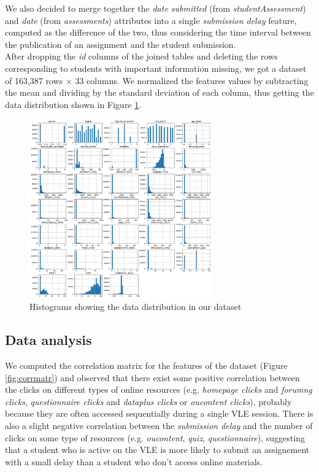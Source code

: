 \documentclass{article}
\begin{document}
We also decided to merge together the \textit{date submitted} (from \textit{studentAssessment}) and \textit{date} (from \textit{assessments}) attributes into a single \textit{submission delay} feature, computed as the difference of the two, thus considering the time interval between the publication of an assignment and the  student submission.\\

After dropping the \textit{id} columns of the joined tables and deleting the rows corresponding to students with important information missing, we got a dataset of 163,387 rows × 33 columns. We normalized the features values by subtracting the mean and dividing by the standard deviation of each column, thus getting the data distribution shown in Figure \ref{fig:distr}.\\


\begin{figure}
\centering
\includegraphics[width=0.7\textwidth]{data_distribution.png}
\caption{\label{fig:distr}Histograms showing the data distribution in our dataset}
\end{figure}

\subsection{Data analysis}

We computed the correlation matrix for the features of the dataset (Figure \ref{fig:corrmatr}) and observed that there exist some positive correlation between the clicks on different types of online resources (e.g. \textit{homepage clicks} and \textit{forumng clicks}, \textit{questionnaire clicks} and \textit{dataplus clicks} or \textit{oucontent clicks}), probably because they are often accessed sequentially during a single VLE session. There is also a slight negative correlation between the \textit{submission delay} and the number of clicks on some type of resources (e.g. \textit{oucontent}, \textit{quiz}, \textit{questionnaire}), suggesting that a student who is active on the VLE is more likely to submit an assignement with a small delay than a student who don't access online materials.\\
\end{document}

